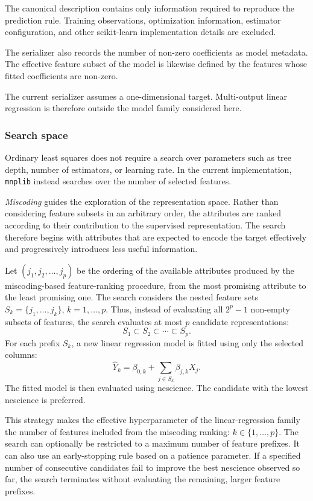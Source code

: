 The canonical description contains only information required to reproduce the prediction rule. Training observations, optimization information, estimator configuration, and other scikit-learn implementation details are excluded.

The serializer also records the number of non-zero coefficients as model metadata. The effective feature subset of the model is likewise defined by the features whose fitted coefficients are non-zero.

The current serializer assumes a one-dimensional target. Multi-output linear regression is therefore outside the model family considered here.

\subsubsection{Search space}

Ordinary least squares does not require a search over parameters such as tree depth, number of estimators, or learning rate. In the current implementation, \texttt{mnplib} instead searches over the number of selected features.

\emph{Miscoding} guides the exploration of the representation space. Rather than considering feature subsets in an arbitrary order, the attributes are ranked according to their contribution to the supervised representation. The search therefore begins with attributes that are expected to encode the target effectively and progressively introduces less useful information.

Let $(j_1,j_2,\ldots,j_p)$ be the ordering of the available attributes produced by the miscoding-based feature-ranking procedure, from the most promising attribute to the least promising one. The search considers the nested feature sets $S_k = \{j_1,\ldots,j_k\}$, $k=1,\ldots,p$. Thus, instead of evaluating all $2^p-1$ non-empty subsets of features, the search evaluates at most $p$ candidate representations:
\[
S_1\subset S_2\subset \cdots \subset S_p.
\]
For each prefix $S_k$, a new linear regression model is fitted using only the selected columns:
\[
\widehat{Y}_k = \beta_{0,k} + \sum_{j\in S_k}\beta_{j,k}X_j.
\]
The fitted model is then evaluated using nescience. The candidate with the lowest nescience is preferred.

This strategy makes the effective hyperparameter of the linear-regression family the number of features included from the miscoding ranking: $k \in \{1,\ldots,p\}$. The search can optionally be restricted to a maximum number of feature prefixes. It can also use an early-stopping rule based on a patience parameter. If a specified number of consecutive candidates fail to improve the best nescience observed so far, the search terminates without evaluating the remaining, larger feature prefixes.

